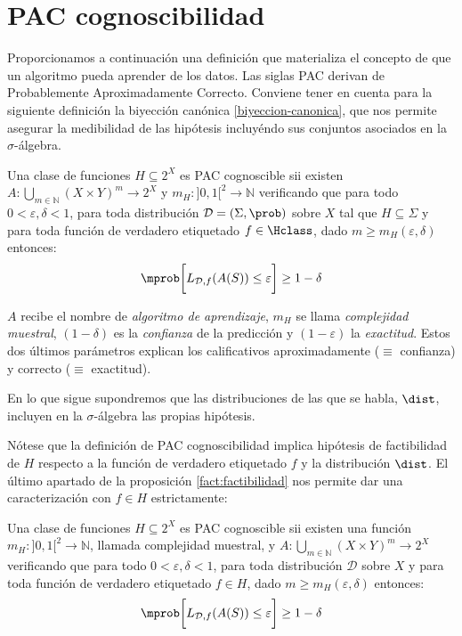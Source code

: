 \section{PAC cognoscibilidad}
Proporcionamos a continuación una definición que materializa el concepto de que un algoritmo pueda aprender de los datos. Las
siglas PAC derivan de Probablemente Aproximadamente Correcto. Conviene tener en cuenta para la siguiente definición la
biyección canónica \ref{biyeccion-canonica}, que nos permite asegurar la medibilidad de las hipótesis incluyéndo sus conjuntos
asociados en la $\sigma$-álgebra.

\begin{definition}
Una clase de funciones $H \subseteq 2^X$ es PAC cognoscible sii existen $A: \underset{m\in \mathbb{N}}{\bigcup} (X\times Y)^m \rightarrow 2^X$ 
y $m_{H} : ]0,1[^2\rightarrow \mathbb{N}$ verificando que para todo
$0 < \varepsilon, \delta < 1$, para toda distribución $\mathcal{D}=(\Sigma, \prob)$ sobre $X$ tal que $H\subseteq \Sigma$
y para toda función de verdadero etiquetado $f\in \Hclass$, dado $m \ge m_H(\varepsilon, \delta)$ entonces:
\[
  \mprob \bigg[L_{\mathcal{D},f}(A(S)) \le \varepsilon \bigg] \ge 1-\delta
\]
\end{definition}

$A$ recibe el nombre de \textit{algoritmo de aprendizaje}, $m_H$ se llama \textit{complejidad muestral}, $(1-\delta)$ es la 
\textit{confianza} de la predicción y $(1-\varepsilon)$ la \textit{exactitud}. Estos dos últimos parámetros explican los 
calificativos aproximadamente ($\equiv$ confianza) y correcto ($\equiv$ exactitud).

En lo que sigue supondremos que las distribuciones de las que se habla, $\dist$, incluyen en la $\sigma$-álgebra las propias
hipótesis.

Nótese que la definición de PAC cognoscibilidad implica hipótesis de factibilidad de $H$ respecto a la función de verdadero
etiquetado $f$ y la distribución $\dist$. El último apartado de la proposición \ref{fact:factibilidad} 
nos permite dar una caracterización con $f\in H$ estrictamente:

\begin{charact}
Una clase de funciones $H \subseteq 2^X$ es PAC cognoscible sii existen una función 
$m_{H} : ]0,1[^2\rightarrow \mathbb{N}$, llamada complejidad muestral, y 
$A: \underset{m\in \mathbb{N}}{\bigcup} (X\times Y)^m \rightarrow 2^X$ verificando que para todo
$0 < \varepsilon, \delta < 1$, para toda distribución $\mathcal{D}$ sobre $X$ y para toda función de 
verdadero etiquetado $f\in H$, dado $m \ge m_H(\varepsilon, \delta)$ entonces:
\[
  \mprob \bigg[L_{\mathcal{D},f}(A(S)) \le \varepsilon \bigg] \ge 1-\delta
\]
\label{def:pac}
\end{charact}

